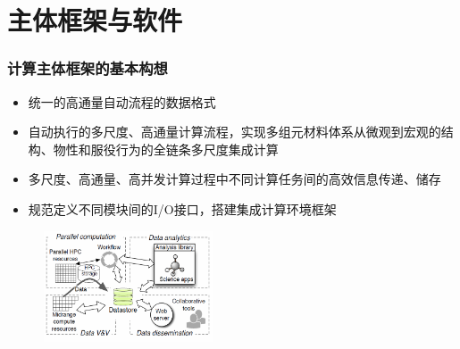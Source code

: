 \documentclass[cjk,slidestop,handout,compress,mathserif,blue]{beamer}	%
\begin{document}
\section{主体框架与软件}
\frame
{
	\frametitle{计算主体框架的基本构想}
	\begin{itemize}
		\item 统一的高通量自动流程的数据格式
		\item 自动执行的多尺度、高通量计算流程，实现多组元材料体系从微观到宏观的结构、物性和服役行为的全链条多尺度集成计算
		\item 多尺度、高通量、高并发计算过程中不同计算任务间的高效信息传递、储存
		\item 规范定义不同模块间的I/O接口，搭建集成计算环境框架
	\end{itemize}
\begin{figure}[h!]
\centering
\vspace*{-0.2in}
\includegraphics[height=1.3in,width=2.0in,viewport=0 0 680 460,clip]{Figures/Parallel_computation.png}
\caption{\fontsize{5.2pt}{2.5pt}}%
\label{parallel_computation}
\end{figure} 
}
\end{document}
